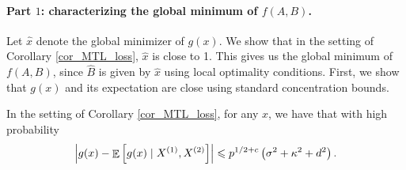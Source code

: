 \paragraph{Part $1$: characterizing the global minimum of $f(A, B)$.}
Let $\hat{x}$ denote the global minimizer of $g(x)$.
We show that in the setting of Corollary \ref{cor_MTL_loss}, $\hat x$ is close to 1.
This gives us the global minimum of $f(A, B)$, since $\hat{B}$ is given by $\hat{x}$ using local optimality conditions.
First, we show that $g(x)$ and its expectation are close using standard concentration bounds.
\begin{claim}\label{claim_largedev1}
 In the setting of Corollary \ref{cor_MTL_loss}, for any $x$, we have that with high probability
$$\left| g(x) - \mathop{\mathbb{E}}\left[ g(x) \mid X^{(1)}, X^{(2)}  \right]\right| \leqslant p^{1/2+c} \left(\sigma^2 + \kappa^2+d^2 \right).$$
\end{claim}
